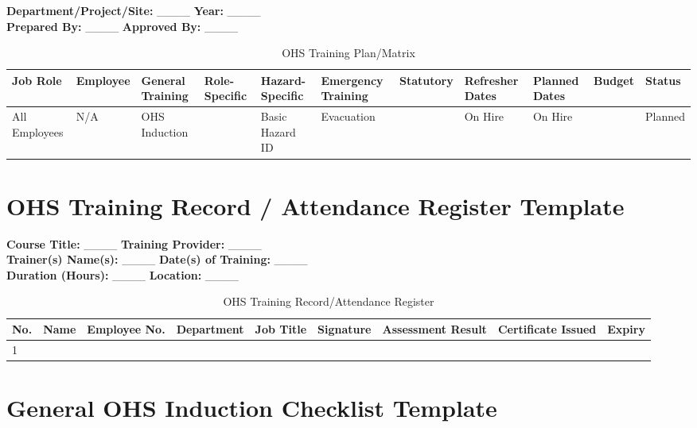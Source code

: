 \documentclass[12pt]{article}
\begin{document}
\textbf{Department/Project/Site:} \_\_\_\_ \textbf{Year:} \_\_\_\_\\
\textbf{Prepared By:} \_\_\_\_ \textbf{Approved By:} \_\_\_\_

\begin{table}[h]
    \centering
    \begin{tabular}{p{2cm}p{2cm}p{2cm}p{2cm}p{2cm}p{2cm}p{2cm}p{2cm}p{2cm}p{2cm}p{2cm}}
        \toprule
        \textbf{Job Role} & \textbf{Employee} & \textbf{General Training} & \textbf{Role-Specific} & \textbf{Hazard-Specific} & \textbf{Emergency Training} & \textbf{Statutory} & \textbf{Refresher Dates} & \textbf{Planned Dates} & \textbf{Budget} & \textbf{Status} \\
        \midrule
        All Employees & N/A & OHS Induction & & Basic Hazard ID & Evacuation & & On Hire & On Hire & & Planned \\
        \bottomrule
    \end{tabular}
    \caption{OHS Training Plan/Matrix}
\end{table}

\section{OHS Training Record / Attendance Register Template}

\textbf{Course Title:} \_\_\_\_ \textbf{Training Provider:} \_\_\_\_\\
\textbf{Trainer(s) Name(s):} \_\_\_\_ \textbf{Date(s) of Training:} \_\_\_\_\\
\textbf{Duration (Hours):} \_\_\_\_ \textbf{Location:} \_\_\_\_

\begin{table}[h]
    \centering
    \begin{tabular}{p{1cm}p{3cm}p{2cm}p{2cm}p{2cm}p{2cm}p{2cm}p{2cm}p{2cm}}
        \toprule
        \textbf{No.} & \textbf{Name} & \textbf{Employee No.} & \textbf{Department} & \textbf{Job Title} & \textbf{Signature} & \textbf{Assessment Result} & \textbf{Certificate Issued} & \textbf{Expiry} \\
        \midrule
        1 & & & & & & & & \\
        \bottomrule
    \end{tabular}
    \caption{OHS Training Record/Attendance Register}
\end{table}

\section{General OHS Induction Checklist Template}
\end{document}
